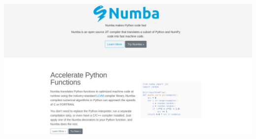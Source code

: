 \documentclass[aspectratio=169]{beamer}
\begin{document}
\begin{frame}{}
\begin{columns}
\includegraphics[width=\linewidth]{numba-website.png}
\end{columns}
\end{frame}

\end{document}
